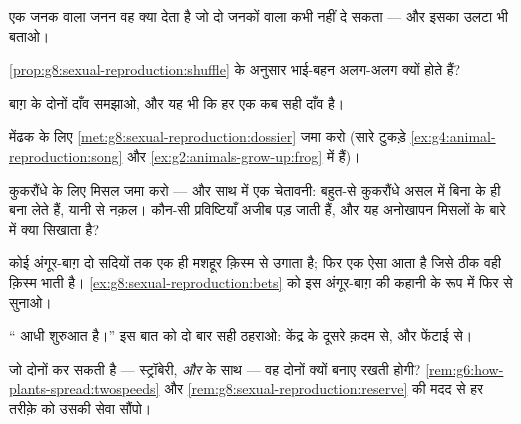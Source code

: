 \begin{exercise}[$\star$]\label{exo:g8:sexual-reproduction:5}
एक जनक वाला जनन वह क्या देता है जो दो जनकों वाला कभी नहीं दे सकता ---
और इसका उलटा भी बताओ।
\end{exercise}

\begin{exercise}[$\star$]\label{exo:g8:sexual-reproduction:6}
\cref{prop:g8:sexual-reproduction:shuffle} के अनुसार भाई-बहन अलग-अलग
क्यों होते हैं?
\end{exercise}

\begin{exercise}[$\star\star$]\label{exo:g8:sexual-reproduction:7}
बाग़ के दोनों दाँव समझाओ, और यह भी कि हर एक कब सही दाँव है।
\end{exercise}

\begin{exercise}[$\star\star$]\label{exo:g8:sexual-reproduction:8}
मेंढक के लिए \cref{met:g8:sexual-reproduction:dossier} जमा करो (सारे
टुकड़े \cref{ex:g4:animal-reproduction:song} और
\cref{ex:g2:animals-grow-up:frog} में हैं)।
\end{exercise}

\begin{exercise}[$\star\star$]\label{exo:g8:sexual-reproduction:9}
कुकरौंधे के लिए मिसल जमा करो --- और साथ में एक चेतावनी: बहुत-से
कुकरौंधे असल में बिना  के ही  बना लेते हैं, यानी  से नक़ल।
कौन-सी प्रविष्टियाँ अजीब पड़ जाती हैं, और यह अनोखापन मिसलों के बारे में
क्या सिखाता है?
\end{exercise}

\begin{exercise}[$\star\star$]\label{exo:g8:sexual-reproduction:10}
कोई अंगूर-बाग़ दो सदियों तक एक ही मशहूर क़िस्म  से उगाता है; फिर
एक ऐसा  आता है जिसे ठीक वही क़िस्म भाती है।
\cref{ex:g8:sexual-reproduction:bets} को इस अंगूर-बाग़ की कहानी के रूप
में फिर से सुनाओ।
\end{exercise}

\begin{exercise}[$\star\star$]\label{exo:g8:sexual-reproduction:11}
`` आधी शुरुआत है।'' इस बात को दो बार सही ठहराओ: केंद्र के दूसरे
क़दम से, और फेंटाई से।
\end{exercise}

\begin{exercise}[$\star\star\star$]\label{exo:g8:sexual-reproduction:12}
जो  दोनों कर सकती है --- स्ट्रॉबेरी,  \emph{और}
 के साथ --- वह दोनों क्यों बनाए रखती होगी?
\cref{rem:g6:how-plants-spread:twospeeds} और
\cref{rem:g8:sexual-reproduction:reserve} की मदद से हर तरीक़े को उसकी
सेवा सौंपो।
\end{exercise}

